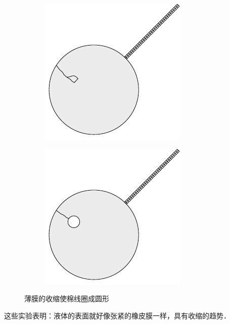 \begin{figure}[htbp]
	\centering
	\begin{subfigure}{0.43\linewidth}
		\centering
		\includegraphics{fig/B/4-10a.pdf}
		\caption{}\label{fig_B_4-10a}
	\end{subfigure}
	\hfil
	\begin{subfigure}{0.43\linewidth}
		\centering
		\includegraphics{fig/B/4-10b.pdf}
		\caption{}\label{fig_B_4-10b}
	\end{subfigure}
	\caption{薄膜的收缩使棉线圈成圆形}\label{fig_B_4-10}
\end{figure}


这些实验表明：液体的表面就好像张紧的橡皮膜一样，具有收缩的趋势．

